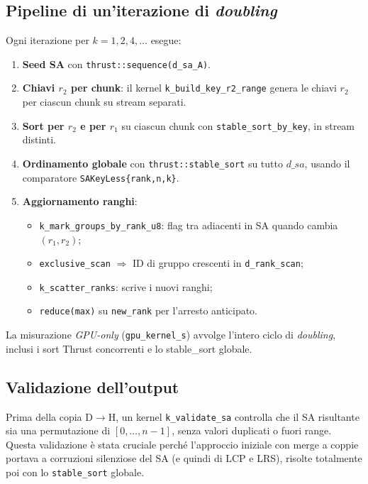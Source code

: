 		\subsection{Pipeline di un'iterazione di \emph{doubling}}
			Ogni iterazione per $k=1,2,4,\dots$ esegue:
			\begin{enumerate}
				\item \textbf{Seed SA} con \texttt{thrust::sequence(d\_sa\_A)}.
				\item \textbf{Chiavi $r_2$ per chunk}: il kernel \texttt{k\_build\_key\_r2\_range} genera le chiavi $r_2$ per ciascun chunk su stream separati.
				\item \textbf{Sort per $r_2$ e per $r_1$} su ciascun chunk con \texttt{stable\_sort\_by\_key}, in stream distinti.
				\item \textbf{Ordinamento globale} con \texttt{thrust::stable\_sort} su tutto $d\_sa$, usando il comparatore \texttt{SAKeyLess\{rank,n,k\}}.
				\item \textbf{Aggiornamento ranghi}:
				\begin{itemize}
					\item \texttt{k\_mark\_groups\_by\_rank\_u8}: flag tra adiacenti in SA quando cambia $(r_1,r_2)$;
					\item \texttt{exclusive\_scan} $\Rightarrow$ ID di gruppo crescenti in \texttt{d\_rank\_scan};
					\item \texttt{k\_scatter\_ranks}: scrive i nuovi ranghi;
					\item \texttt{reduce(max)} su \texttt{new\_rank} per l’arresto anticipato.
				\end{itemize}
			\end{enumerate}
			La misurazione \emph{GPU-only} (\texttt{gpu\_kernel\_s}) avvolge l’intero ciclo di \emph{doubling}, inclusi i sort Thrust concorrenti e lo stable\_sort globale.
		
		\subsection{Validazione dell'output}
			Prima della copia D$\to$H, un kernel \texttt{k\_validate\_sa} controlla che il SA risultante sia una permutazione di $[0,\dots,n{-}1]$, senza valori duplicati o fuori range.
			Questa validazione è stata cruciale perché l’approccio iniziale con merge a coppie portava a corruzioni silenziose del SA (e quindi di LCP e LRS), risolte totalmente poi con lo \texttt{stable\_sort} globale.
		
